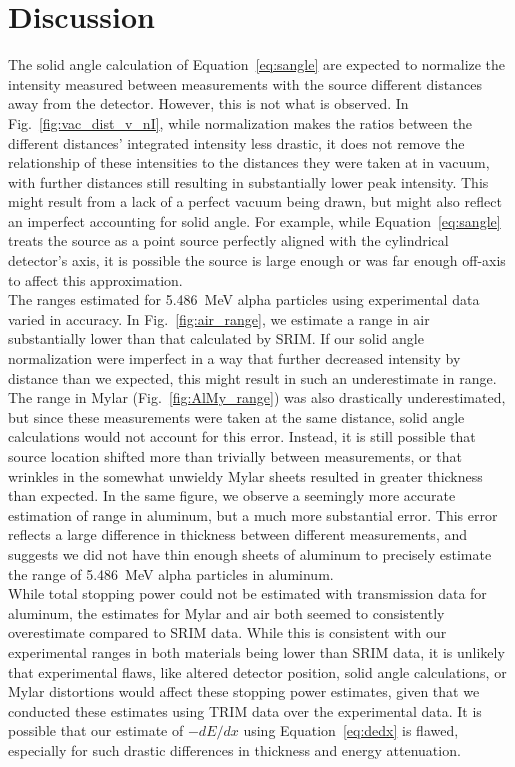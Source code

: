 \documentclass[12pt]{article}
\newcommand{\figref}[1]{Fig.~\ref{#1}}
\begin{document}
\FloatBarrier\section{Discussion}\label{sec:disc}
The solid angle calculation of Equation~\ref{eq:sangle} are expected to normalize the intensity measured between measurements with the source different distances away from the detector.
However, this is not what is observed.
In \figref{fig:vac_dist_v_nI}, while normalization makes the ratios between the different distances' integrated intensity less drastic, it does not remove the relationship of these intensities to the distances they were taken at in vacuum, with further distances still resulting in substantially lower peak intensity.
This might result from a lack of a perfect vacuum being drawn, but might also reflect an imperfect accounting for solid angle.
For example, while Equation~\ref{eq:sangle} treats the source as a point source perfectly aligned with the cylindrical detector's axis, it is possible the source is large enough or was far enough off-axis to affect this approximation.\\

The ranges estimated for 5.486~MeV alpha particles using experimental data varied in accuracy.
In \figref{fig:air_range}, we estimate a range in air substantially lower than that calculated by SRIM.
If our solid angle normalization were imperfect in a way that further decreased intensity by distance than we expected, this might result in such an underestimate in range.
The range in Mylar (\figref{fig:AlMy_range}) was also drastically underestimated, but since these measurements were taken at the same distance, solid angle calculations would not account for this error.
Instead, it is still possible that source location shifted more than trivially between measurements, or that wrinkles in the somewhat unwieldy Mylar sheets resulted in greater thickness than expected.
In the same figure, we observe a seemingly more accurate estimation of range in aluminum, but a much more substantial error.
This error reflects a large difference in thickness between different measurements, and suggests we did not have thin enough sheets of aluminum to precisely estimate the range of 5.486~MeV alpha particles in aluminum.\\

While total stopping power could not be estimated with transmission data for aluminum, the estimates for Mylar and air both seemed to consistently overestimate compared to SRIM data.
While this is consistent with our experimental ranges in both materials being lower than SRIM data, it is unlikely that experimental flaws, like altered detector position, solid angle calculations, or Mylar distortions would affect these stopping power estimates, given that we conducted these estimates using TRIM data over the experimental data.
It is possible that our estimate of $-dE/dx$ using Equation~\ref{eq:dedx} is flawed, especially for such drastic differences in thickness and energy attenuation.\\
\end{document}
